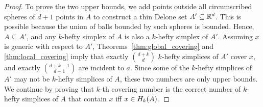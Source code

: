 \documentclass[a4paper,UKenglish,cleveref, autoref,numberwithinsect]{socg-lipics-v2021}
\newcommand {\mm}[1] {\ifmmode{#1}\else{\mbox{\(#1\)}}\fi}
\theoremstyle{plain}
\newcommand{\Rspace}        {\mm{{\mathbb R}}}
\newcommand{\Hull}[2]       {\mm{{H}_{#1}{({#2})}}}
\begin{document}
\begin{proof}
  To prove the two upper bounds, we add points outside all circumscribed spheres of $d+1$ points in $A$ to construct a thin Delone set $A' \subseteq \Rspace^d$.
  This is possible because the union of balls bounded by such spheres is bounded.
  Hence, $A \subseteq A'$, and any $k$-hefty simplex of $A$ is also a $k$-hefty simplex of $A'$.
  Assuming $x$ is generic with respect to $A'$, Theorems~\ref{thm:global_covering} and \ref{thm:local_covering} imply that exactly $\binom{d+k}{d}$ $k$-hefty simplices of $A'$ cover $x$, and exactly $\binom{d+k-1}{d-1}$ are incident to $a$.
  Since some of the $k$-hefty simplices of $A'$ may not be $k$-hefty simplices of $A$, these two numbers are only upper bounds.
  We continue by proving that $k$-th covering number is the correct number of $k$-hefty simplices of $A$ that contain $x$ iff $x \in \Hull{k}{A}$.
    

\end{proof}
\end{document}
